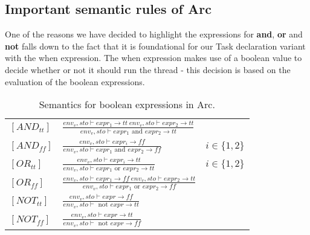 \subsection{Important semantic rules of Arc}\label{subsec:importantSemanticRulesOfArc}
One of the reasons we have decided to highlight the expressions for \textbf{and}, \textbf{or} and \textbf{not} falls down to the fact that it is foundational for our Task declaration variant with the when expression. The when expression makes use of a boolean value to decide whether or not it should run the thread - this decision is based on the evaluation of the boolean expressions.


\begin{table}[htb!]
    \centering
    \begin{tabular}{lll}
        \toprule
        $[AND_{tt}]$ & $\frac
            {env_v, sto \vdash expr_1 \to tt \ env_v, sto \vdash expr_2 \to tt}
            {env_v, sto \vdash expr_1 \text{ and } expr_2 \to tt}$ \\ [12pt]
        $[AND_{ff}]$ & $\frac
            {env_v, sto \vdash expr_i \to ff}
            {env_v, sto \vdash expr_1 \text{ and } expr_2 \to ff}$
                     & $i \in \{1, 2\}$                            \\ [12pt]
        $[OR_{tt}]$  & $\frac
            {env_v, sto \vdash expr_i \to tt}
            {env_v, sto \vdash expr_1 \text{ or } expr_2 \to tt}$
                     & $i \in \{1, 2\}$                            \\ [12pt]
        $[OR_{ff}]$  & $\frac
            {env_v, sto \vdash expr_1 \to ff \ env_v, sto \vdash expr_2 \to tt}
            {env_v, sto \vdash expr_1 \text{ or } expr_2 \to ff}$  \\ [12pt]
        $[NOT_{tt}]$ & $\frac
            {env_v, sto \vdash expr \to ff}
            {env_v, sto \vdash \text{ not } expr \to tt}$          \\ [12pt]
        $[NOT_{ff}]$ & $\frac
            {env_v, sto \vdash expr \to tt}
            {env_v, sto \vdash \text{ not } expr \to ff}$          \\
        \bottomrule
    \end{tabular}
    \caption{Semantics for boolean expressions in Arc.}
    \label{tab:booleansemantics}
\end{table}

